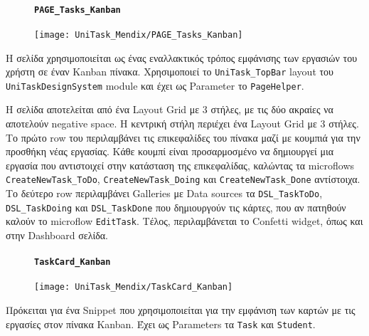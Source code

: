                 \begin{figure}[H] \noindent
                    \paragraph{\texttt{PAGE\_Tasks\_Kanban}}
                    \begin{center}
                        \texttt{[image: UniTask\_Mendix/PAGE\_Tasks\_Kanban]}
                    \end{center}
                \end{figure}

                Η σελίδα χρησιμοποιείται ως ένας εναλλακτικός τρόπος εμφάνισης των εργασιών του χρήστη σε έναν Kanban πίνακα. Χρησιμοποιεί το \texttt{UniTask\_TopBar} layout του \texttt{UniTaskDesignSystem} module και έχει ως Parameter το \texttt{PageHelper}.

                Η σελίδα αποτελείται από ένα Layout Grid με 3 στήλες, με τις δύο ακραίες να αποτελούν negative space. Η κεντρική στήλη περιέχει ένα Layout Grid με 3 στήλες. Το πρώτο row του περιλαμβάνει τις επικεφαλίδες του πίνακα μαζί με κουμπιά για την προσθήκη νέας εργασίας. Κάθε κουμπί είναι προσαρμοσμένο να δημιουργεί μια εργασία που αντιστοιχεί στην κατάσταση της επικεφαλίδας, καλώντας τα microflows \texttt{CreateNewTask\_ToDo}, \texttt{CreateNewTask\_Doing} και \texttt{CreateNewTask\_Done} αντίστοιχα. Το δεύτερο row περιλαμβάνει Galleries με Data sources τα \texttt{DSL\_TaskToDo}, \texttt{DSL\_TaskDoing} και \texttt{DSL\_TaskDone} που δημιουργούν τις κάρτες, που αν πατηθούν καλούν το microflow \texttt{EditTask}. Τέλος, περιλαμβάνεται το Confetti widget, όπως και στην Dashboard σελίδα.

                \begin{figure}[H] \noindent
                    \paragraph{\texttt{TaskCard\_Kanban}}
                    \begin{center}
                        \texttt{[image: UniTask\_Mendix/TaskCard\_Kanban]}
                    \end{center}
                \end{figure}

                Πρόκειται για ένα Snippet που χρησιμοποιείται για την εμφάνιση των καρτών με τις εργασίες στον πίνακα Kanban. Έχει ως Parameters τα \texttt{Task} και \texttt{Student}.

